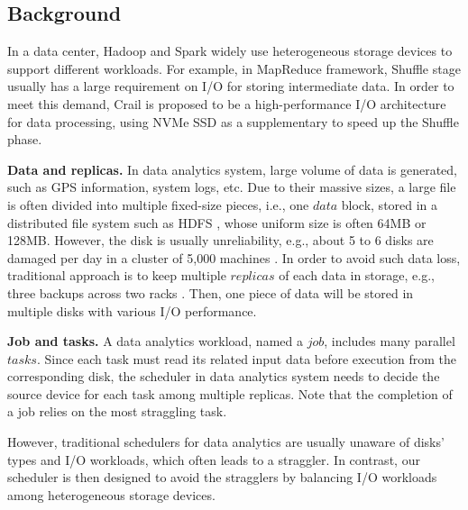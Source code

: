 \documentclass[conference]{IEEEtran}
\begin{document}
\subsection{Background}\label{AA}

In a data center, Hadoop and Spark widely use heterogeneous storage devices to support different workloads. For example, in MapReduce framework, Shuffle stage \cite{b42} \cite{b41} usually has a large requirement on I/O for storing intermediate data. In order to meet this demand, Crail \cite{b37} is proposed to be a high-performance I/O architecture for data processing, using NVMe SSD \cite{b45} as a supplementary to speed up the Shuffle phase.

\textbf{Data and replicas.} In data analytics system, large volume of data is generated, such as GPS information\cite{b38}, system logs\cite{b39}, etc. Due to their massive sizes, a large file is often divided into multiple fixed-size pieces, i.e., one $data$ block, stored in a distributed file system such as HDFS \cite{b19}, whose uniform size is often 64MB or 128MB. However, the disk is usually unreliability, e.g., about 5 to 6 disks are damaged per day in a cluster of 5,000 machines \cite{b32}. In order to avoid such data loss, traditional approach is to keep multiple $replicas$ of each data in storage, e.g., three backups across two racks \cite{b19}. Then, one piece of data will be stored in multiple disks with various I/O performance.

\textbf{Job and tasks.} A data analytics workload, named a $job$, includes many parallel $tasks$. Since each task must read its related input data before execution from the corresponding disk, the scheduler in data analytics system needs to decide the source device for each task among multiple replicas. Note that the completion of a job relies on the most straggling task.


However, traditional schedulers for data analytics are usually unaware of disks' types and I/O workloads, which often leads to a straggler. In contrast, our scheduler is then designed to avoid the stragglers by balancing I/O workloads among heterogeneous storage devices.
\end{document}
